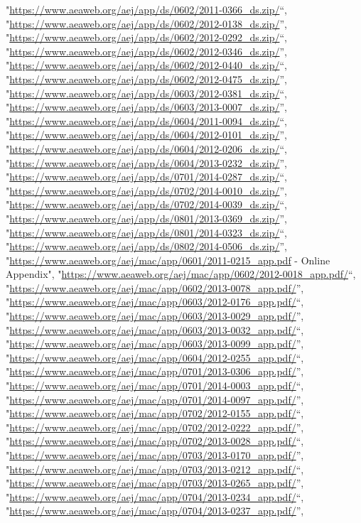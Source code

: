 \documentclass[]{article}
\begin{document}
\begin{itemize}
  "\url{https://www.aeaweb.org/aej/app/ds/0602/2011-0366_ds.zip/}``,
  "\url{https://www.aeaweb.org/aej/app/ds/0602/2012-0138_ds.zip/}'',
  "\url{https://www.aeaweb.org/aej/app/ds/0602/2012-0292_ds.zip/}``,
  "\url{https://www.aeaweb.org/aej/app/ds/0602/2012-0346_ds.zip/}'',
  "\url{https://www.aeaweb.org/aej/app/ds/0602/2012-0440_ds.zip/}``,
  "\url{https://www.aeaweb.org/aej/app/ds/0602/2012-0475_ds.zip/}'',
  "\url{https://www.aeaweb.org/aej/app/ds/0603/2012-0381_ds.zip/}``,
  "\url{https://www.aeaweb.org/aej/app/ds/0603/2013-0007_ds.zip/}'',
  "\url{https://www.aeaweb.org/aej/app/ds/0604/2011-0094_ds.zip/}``,
  "\url{https://www.aeaweb.org/aej/app/ds/0604/2012-0101_ds.zip/}'',
  "\url{https://www.aeaweb.org/aej/app/ds/0604/2012-0206_ds.zip/}``,
  "\url{https://www.aeaweb.org/aej/app/ds/0604/2013-0232_ds.zip/}'',
  "\url{https://www.aeaweb.org/aej/app/ds/0701/2014-0287_ds.zip/}``,
  "\url{https://www.aeaweb.org/aej/app/ds/0702/2014-0010_ds.zip/}'',
  "\url{https://www.aeaweb.org/aej/app/ds/0702/2014-0039_ds.zip/}``,
  "\url{https://www.aeaweb.org/aej/app/ds/0801/2013-0369_ds.zip/}'',
  "\url{https://www.aeaweb.org/aej/app/ds/0801/2014-0323_ds.zip/}``,
  "\url{https://www.aeaweb.org/aej/app/ds/0802/2014-0506_ds.zip/}'',
  "\url{https://www.aeaweb.org/aej/mac/app/0601/2011-0215_app.pdf} -
  Online Appendix",
  "\url{https://www.aeaweb.org/aej/mac/app/0602/2012-0018_app.pdf/}``,
  "\url{https://www.aeaweb.org/aej/mac/app/0602/2013-0078_app.pdf/}'',
  "\url{https://www.aeaweb.org/aej/mac/app/0603/2012-0176_app.pdf/}``,
  "\url{https://www.aeaweb.org/aej/mac/app/0603/2013-0029_app.pdf/}'',
  "\url{https://www.aeaweb.org/aej/mac/app/0603/2013-0032_app.pdf/}``,
  "\url{https://www.aeaweb.org/aej/mac/app/0603/2013-0099_app.pdf/}'',
  "\url{https://www.aeaweb.org/aej/mac/app/0604/2012-0255_app.pdf/}``,
  "\url{https://www.aeaweb.org/aej/mac/app/0701/2013-0306_app.pdf/}'',
  "\url{https://www.aeaweb.org/aej/mac/app/0701/2014-0003_app.pdf/}``,
  "\url{https://www.aeaweb.org/aej/mac/app/0701/2014-0097_app.pdf/}'',
  "\url{https://www.aeaweb.org/aej/mac/app/0702/2012-0155_app.pdf/}``,
  "\url{https://www.aeaweb.org/aej/mac/app/0702/2012-0222_app.pdf/}'',
  "\url{https://www.aeaweb.org/aej/mac/app/0702/2013-0028_app.pdf/}``,
  "\url{https://www.aeaweb.org/aej/mac/app/0703/2013-0170_app.pdf/}'',
  "\url{https://www.aeaweb.org/aej/mac/app/0703/2013-0212_app.pdf/}``,
  "\url{https://www.aeaweb.org/aej/mac/app/0703/2013-0265_app.pdf/}'',
  "\url{https://www.aeaweb.org/aej/mac/app/0704/2013-0234_app.pdf/}``,
  "\url{https://www.aeaweb.org/aej/mac/app/0704/2013-0237_app.pdf/}'',

\end{itemize}
\end{document}
